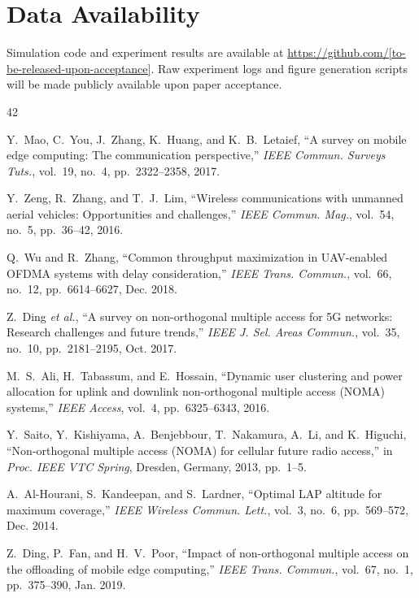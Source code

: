 \documentclass[journal]{IEEEtran}
\begin{document}
\section*{Data Availability}
Simulation code and experiment results are available at \url{https://github.com/[to-be-released-upon-acceptance]}. Raw experiment logs and figure generation scripts will be made publicly available upon paper acceptance.

\begin{thebibliography}{42}

 Y.~Mao, C.~You, J.~Zhang, K.~Huang, and K.~B.~Letaief, ``A survey on mobile edge computing: The communication perspective,'' \emph{IEEE Commun. Surveys Tuts.}, vol.~19, no.~4, pp.~2322--2358, 2017.

 Y.~Zeng, R.~Zhang, and T.~J.~Lim, ``Wireless communications with unmanned aerial vehicles: Opportunities and challenges,'' \emph{IEEE Commun. Mag.}, vol.~54, no.~5, pp.~36--42, 2016.

 Q.~Wu and R.~Zhang, ``Common throughput maximization in UAV-enabled OFDMA systems with delay consideration,'' \emph{IEEE Trans. Commun.}, vol.~66, no.~12, pp.~6614--6627, Dec. 2018.

 Z.~Ding \emph{et al.}, ``A survey on non-orthogonal multiple access for 5G networks: Research challenges and future trends,'' \emph{IEEE J. Sel. Areas Commun.}, vol.~35, no.~10, pp.~2181--2195, Oct. 2017.

 M.~S.~Ali, H.~Tabassum, and E.~Hossain, ``Dynamic user clustering and power allocation for uplink and downlink non-orthogonal multiple access (NOMA) systems,'' \emph{IEEE Access}, vol.~4, pp.~6325--6343, 2016.

 Y.~Saito, Y.~Kishiyama, A.~Benjebbour, T.~Nakamura, A.~Li, and K.~Higuchi, ``Non-orthogonal multiple access (NOMA) for cellular future radio access,'' in \emph{Proc. IEEE VTC Spring}, Dresden, Germany, 2013, pp.~1--5.

 A.~Al-Hourani, S.~Kandeepan, and S.~Lardner, ``Optimal LAP altitude for maximum coverage,'' \emph{IEEE Wireless Commun. Lett.}, vol.~3, no.~6, pp.~569--572, Dec. 2014.

 Z.~Ding, P.~Fan, and H.~V.~Poor, ``Impact of non-orthogonal multiple access on the offloading of mobile edge computing,'' \emph{IEEE Trans. Commun.}, vol.~67, no.~1, pp.~375--390, Jan. 2019.


\end{thebibliography}
\end{document}
